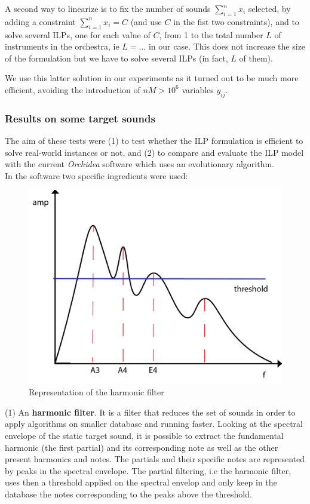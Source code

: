 \documentclass[a4paper]{book}
\begin{document}
A second way to linearize is to fix the number of sounds $\sum_{i=1}^n x_i$ selected, by adding a constraint $\sum_{i=1}^n x_i=C$ (and use $C$ in the fist two constraints), and to solve several ILPs, one for each value of $C$, from 1 to the total number $L$ of instruments in the orchestra, ie $L=...$ in our case. This  does not increase the size of the formulation but we have to solve several ILPs (in fact, $L$ of them). 

We use this latter solution in our experiments as it turned out to be much more efficient, avoiding the introduction of $nM>10^6$ variables $y_{ij}$.


\subsubsection{Results on some target sounds}


The aim of these tests were (1) to test whether the ILP formulation is efficient to solve real-world instances or not, and (2) to compare and evaluate the ILP model with the current \textit{Orchidea} software which uses an evolutionary algorithm.\\
In the software two specific ingredients were used:
\begin{figure}[!h]
    \centering
    \includegraphics[scale=0.3]{harmofilter.png}
    \caption{Representation of the harmonic filter}
    \label{fig:harmofilter}
\end{figure}

(1) An \textbf{harmonic filter}. It is a filter that reduces the set of sounds in order to apply algorithms on smaller database and running faster. Looking at the spectral envelope of the static target sound, it is possible to extract the fundamental harmonic (the first partial) and its corresponding note as well as the other present harmonics and notes. The partials and their specific notes are represented by peaks in the spectral envelope. The partial filtering, i.e the harmonic filter, uses then a threshold applied on the spectral envelop and only keep in the database the notes corresponding to the peaks above the threshold. \\
\end{document}
